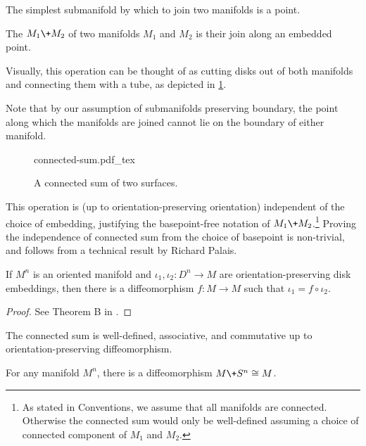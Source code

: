 The simplest submanifold by which to join two manifolds is a point.

\begin{definition}
	The  $M_1\+M_2$ of two manifolds $M_1$ and $M_2$ is their join along an embedded point.
\end{definition}

Visually, this operation can be thought of as cutting disks out of both manifolds and connecting them with a tube, as depicted in \cref{fig:connected-sum}.

\begin{remark}
	Note that by our assumption of submanifolds preserving boundary, the point along which the manifolds are joined cannot lie on the boundary of either manifold.
\end{remark}

\begin{figure}[ht]
	\centering
	{connected-sum.pdf_tex}
	\caption{A connected sum of two surfaces.}\label{fig:connected-sum}
\end{figure}

This operation is (up to orientation-preserving orientation) independent of the choice of embedding, justifying the basepoint-free notation of $M_1\+ M_2$.\footnote{As stated in Conventions, we assume that all manifolds are connected. Otherwise the connected sum would only be well-defined assuming a choice of connected component of $M_1$ and $M_2$.}
Proving the independence of connected sum from the choice of basepoint is non-trivial, and follows from a technical result by Richard Palais.

\begin{theorem}\label{thm:disk}
	If $M^n$ is an oriented manifold and $\iota_1, \iota_2 : D^n \to M$ are orientation-preserving disk embeddings, then there is a diffeomorphism $f : M \to M$ such that $\iota_1 = f\circ \iota_2$.
\end{theorem}
\begin{proof}
	See Theorem B in \cite{palais1960diffeomorphism}.
\end{proof}

\begin{corollary}\label{cor:connected-sum-operation}
		The connected sum is well-defined, associative, and commutative up to orientation-preserving diffeomorphism.
\end{corollary}

\begin{corollary}
	For any manifold $M^n$, there is a diffeomorphism $M\+ S^n\cong M$.
\end{corollary}

